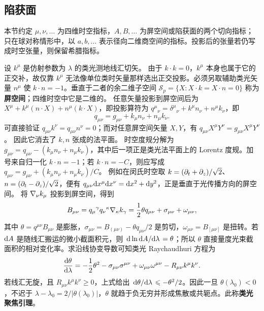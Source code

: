 \subsection{陷获面}

本节约定 $\mu,\nu,\ldots$ 为四维时空指标，$A,B,\ldots$ 为屏空间或陷获面的两个切向指标；只在球对称情形中，以 $a,b,\ldots$ 表示径向二维商空间的指标。投影后的张量若仍写成时空张量，则保留希腊指标。

设 $k^\mu$ 是仿射参数为 $\lambda$ 的类光测地线汇切矢。
由于 $k\cdot k=0$，$k^\mu$ 本身也属于它的正交补，故仅靠 $k^\mu$ 无法像单位类时矢量那样选出正交投影。必须另取辅助类光矢量 $n^\mu$ 使 $k\cdot n=-1$。垂直于二者的余二维子空间 $\mathcal S_p=\{X:X\cdot k=X\cdot n=0\}$ 称为\textbf{屏空间}；四维时空中它是二维的。
任意矢量投影到屏空间后为 $X^\mu+k^\mu(n\cdot X)+n^\mu(k\cdot X)$，即投影算符为 $q^\mu{}_\nu=\delta^\mu{}_\nu+k^\mu n_\nu+n^\mu k_\nu$，即
\[q_{\mu\nu}=g_{\mu\nu}+k_\mu n_\nu+n_\mu k_\nu.\]
可直接验证 $q_{\mu\nu}k^\nu=q_{\mu\nu}n^\nu=0$；而对任意屏空间矢量 $X,Y$，有 $q_{\mu\nu}X^\mu Y^\nu=g_{\mu\nu}X^\mu Y^\nu$。
因此它消去了 $k,n$ 张成的法平面。
时空度规分解为 $g_{\mu\nu}=q_{\mu\nu}-(k_\mu n_\nu+n_\mu k_\nu)$，其中后一项正是类光法平面上的 Lorentz 度规。加号来自归一化 $k\cdot n=-1$；若 $k\cdot n=-C$，则应写成 $q_{\mu\nu}=g_{\mu\nu}+(k_\mu n_\nu+n_\mu k_\nu)/C$。
例如在闵氏时空取 $k=(\partial_t+\partial_z)/\sqrt2$、$n=(\partial_t-\partial_z)/\sqrt2$，便有 $q_{\mu\nu}\dd x^\mu\dd x^\nu=\dd x^2+\dd y^2$，正是垂直于光传播方向的屏空间。
将 $\nabla_\nu k_\mu $ 投影到屏空间，得到
\begin{equation}
    B_{\mu\nu}=q_\mu{}^\gamma q_\nu{}^\kappa\nabla_\kappa k_\gamma
      =\frac12\theta q_{\mu\nu}+\sigma_{\mu\nu}+\omega_{\mu\nu},
\end{equation}
其中 $\theta=q^{\mu\nu}B_{\mu\nu}$ 是膨胀，$\sigma_{\mu\nu}=B_{(\mu\nu)}-\theta q_{\mu\nu}/2$ 是剪切，$\omega_{\mu\nu}=B_{[\mu\nu]}$ 是扭转。若 $\dd A$ 是随线汇搬运的微小截面积元，则 $\dv*{\ln\dd A}{\lambda}=\theta$；所以 $\theta$ 直接量度光束截面积的相对变化率。求沿线协变导数可知类光 Raychaudhuri 方程为
\begin{equation}\label{eq:null-raychaudhuri}
    \dv{\theta}{\lambda}
    =-\frac12\theta^2-\sigma_{\mu\nu}\sigma^{\mu\nu}
      +\omega_{\mu\nu}\omega^{\mu\nu}-R_{\mu\nu}k^\mu k^\nu .
\end{equation}
若线汇无旋，且 $R_{\mu\nu}k^\mu k^\nu\geqslant 0$，上式给出 $\dv*{\theta}{\lambda}\leqslant-\theta^2/2$。因此一旦 $\theta(\lambda_0)<0$，不迟于 $\lambda-\lambda_0=2/|\theta(\lambda_0)|$，$\theta$ 就趋于负无穷并形成焦散或共轭点。此称\textbf{类光聚焦引理}。

